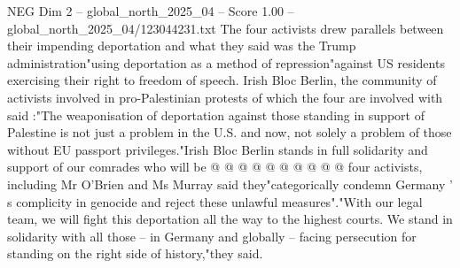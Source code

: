 \begin{textsample}{NEG Dim 2 – global\_north\_2025\_04 – Score 1.00 – global\_north\_2025\_04/123044231.txt}
The four activists drew parallels between their impending deportation and what they said was the Trump administration"using deportation as a method of repression"against US residents exercising their right to freedom of speech.
Irish Bloc Berlin, the community of activists involved in pro-Palestinian protests of which the four are involved with said :"The weaponisation of deportation against those standing in support of Palestine is not just a problem in the U.S. and now, not solely a problem of those without EU passport privileges."Irish Bloc Berlin stands in full solidarity and support of our comrades who will be @ @ @ @ @ @ @ @ @ @ four activists, including Mr O'Brien and Ms Murray said they"categorically condemn Germany ' s complicity in genocide and reject these unlawful measures"."With our legal team, we will fight this deportation all the way to the highest courts.
We stand in solidarity with all those -- in Germany and globally -- facing persecution for standing on the right side of history,"they said.

\end{textsample}

